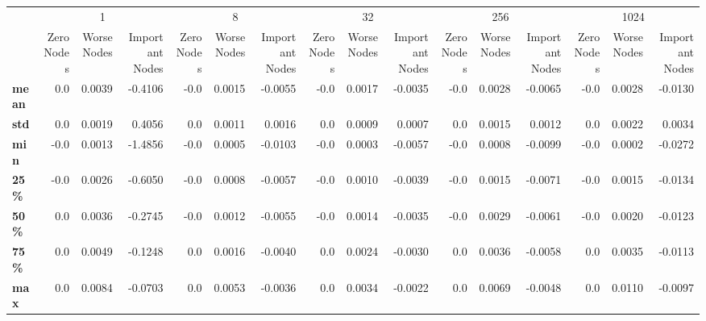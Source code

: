 \begin{tabular}{lrrrrrrrrrrrrrrr}
\toprule
{} & \multicolumn{3}{c}{1} & \multicolumn{3}{c}{8} & \multicolumn{3}{c}{32} & \multicolumn{3}{c}{256} & \multicolumn{3}{c}{1024} \\
{} & Zero Nodes & Worse Nodes & Important Nodes & Zero Nodes & Worse Nodes & Important Nodes & Zero Nodes & Worse Nodes & Important Nodes & Zero Nodes & Worse Nodes & Important Nodes & Zero Nodes & Worse Nodes & Important Nodes \\
\midrule
\textbf{mean} &        0.0 &      0.0039 &         -0.4106 &       -0.0 &      0.0015 &         -0.0055 &       -0.0 &      0.0017 &         -0.0035 &       -0.0 &      0.0028 &         -0.0065 &       -0.0 &      0.0028 &         -0.0130 \\
\textbf{std } &        0.0 &      0.0019 &          0.4056 &        0.0 &      0.0011 &          0.0016 &        0.0 &      0.0009 &          0.0007 &        0.0 &      0.0015 &          0.0012 &        0.0 &      0.0022 &          0.0034 \\
\textbf{min } &       -0.0 &      0.0013 &         -1.4856 &       -0.0 &      0.0005 &         -0.0103 &       -0.0 &      0.0003 &         -0.0057 &       -0.0 &      0.0008 &         -0.0099 &       -0.0 &      0.0002 &         -0.0272 \\
\textbf{25\% } &       -0.0 &      0.0026 &         -0.6050 &       -0.0 &      0.0008 &         -0.0057 &       -0.0 &      0.0010 &         -0.0039 &       -0.0 &      0.0015 &         -0.0071 &       -0.0 &      0.0015 &         -0.0134 \\
\textbf{50\% } &        0.0 &      0.0036 &         -0.2745 &       -0.0 &      0.0012 &         -0.0055 &       -0.0 &      0.0014 &         -0.0035 &       -0.0 &      0.0029 &         -0.0061 &       -0.0 &      0.0020 &         -0.0123 \\
\textbf{75\% } &        0.0 &      0.0049 &         -0.1248 &        0.0 &      0.0016 &         -0.0040 &        0.0 &      0.0024 &         -0.0030 &        0.0 &      0.0036 &         -0.0058 &        0.0 &      0.0035 &         -0.0113 \\
\textbf{max } &        0.0 &      0.0084 &         -0.0703 &        0.0 &      0.0053 &         -0.0036 &        0.0 &      0.0034 &         -0.0022 &        0.0 &      0.0069 &         -0.0048 &        0.0 &      0.0110 &         -0.0097 \\
\bottomrule
\end{tabular}
